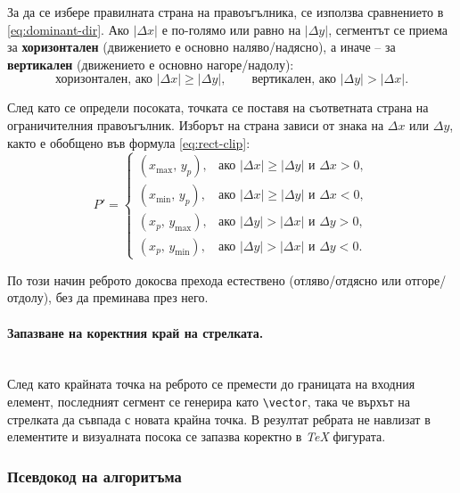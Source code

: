 За да се избере правилната страна на правоъгълника, се използва сравнението в \eqref{eq:dominant-dir}. Ако \(|\Delta x|\) е по-голямо или равно на \(|\Delta y|\), сегментът се приема за \textbf{хоризонтален} (движението е основно наляво/надясно), а иначе -- за \textbf{вертикален} (движението е основно нагоре/надолу):
\begin{equation}
\text{хоризонтален, ако } |\Delta x| \ge |\Delta y|,\qquad
\text{вертикален, ако } |\Delta y| > |\Delta x|.
\label{eq:dominant-dir}
\end{equation}

След като се определи посоката, точката се поставя на съответната страна на ограничителния правоъгълник. Изборът на страна зависи от знака на \(\Delta x\) или \(\Delta y\), както е обобщено във формула \eqref{eq:rect-clip}:
\begin{equation}
P'=
\begin{cases}
(x_{\max},\,y_p), & \text{ако } |\Delta x|\ge|\Delta y| \text{ и } \Delta x>0,\\
(x_{\min},\,y_p), & \text{ако } |\Delta x|\ge|\Delta y| \text{ и } \Delta x<0,\\
(x_p,\,y_{\max}), & \text{ако } |\Delta y|>|\Delta x| \text{ и } \Delta y>0,\\
(x_p,\,y_{\min}), & \text{ако } |\Delta y|>|\Delta x| \text{ и } \Delta y<0.
\end{cases}
\label{eq:rect-clip}
\end{equation}

По този начин реброто докосва прехода естествено (отляво/отдясно или отгоре/отдолу), без да преминава през него.

\paragraph{Запазване на коректния край на стрелката.}
\mbox{}\\
След като крайната точка на реброто се премести до границата на входния елемент, последният сегмент се генерира като \texttt{\textbackslash vector}, така че върхът на стрелката да съвпада с новата крайна точка. В резултат ребрата не навлизат в елементите и визуалната посока се запазва коректно в \textit{TeX} фигурата.

\subsubsection{Псевдокод на алгоритъма}

